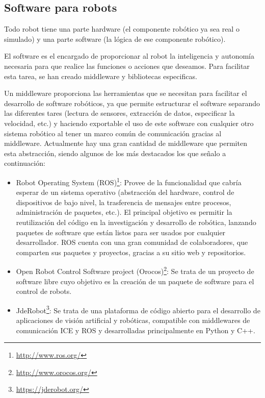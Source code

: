 \subsection{Software para robots}
Todo robot tiene una parte hardware (el componente robótico ya sea real o simulado) y una parte software (la lógica de ese componente robótico).

El software es el encargado de proporcionar al robot la inteligencia y autonomía necesaria para que realice las funciones o acciones que deseamos. Para facilitar esta tarea, se han creado middleware y bibliotecas especificas.

Un middleware  proporciona las herramientas que se necesitan para facilitar el desarrollo de software robóticos, ya que permite estructurar el software separando las diferentes tares (lectura de sensores, extracción de datos, especificar la velocidad, etc.) y haciendo exportable el uso de este software con cualquier otro sistema robótico al tener un marco común de comunicación gracias al middleware.
Actualmente hay una gran cantidad de middleware que permiten esta abstracción, siendo algunos de los más destacados los que señalo a continuación:
\begin{itemize}
	\item Robot Operating System (ROS)\footnote{\url{http://www.ros.org/}}: Provee de la funcionalidad que cabría esperar de un sistema operativo (abstracción del hardware, control de dispositivos de bajo nivel, la trasferencia de mensajes entre procesos, administración de paquetes, etc.). El principal objetivo es permitir la reutilización del código en la investigación y desarrollo de robótica, lanzando paquetes de software que están listos para ser usados por cualquier desarrollador. ROS cuenta con una gran comunidad de colaboradores, que comparten sus paquetes y proyectos, gracias a su sitio web y repositorios.
	\item Open Robot Control Software project (Orocos)\footnote{\url{http://www.orocos.org/}}: Se trata de un proyecto de software libre cuyo objetivo es la creación de un paquete de software para el control de robots.
	\item JdeRobot\footnote{\url{https://jderobot.org/}}: Se trata de una plataforma de código abierto para el desarrollo de aplicaciones de visión artificial y robóticas, compatible con middlewares de comunicación ICE y ROS y desarrolladas principalmente en Python y C++. 
\end{itemize}

